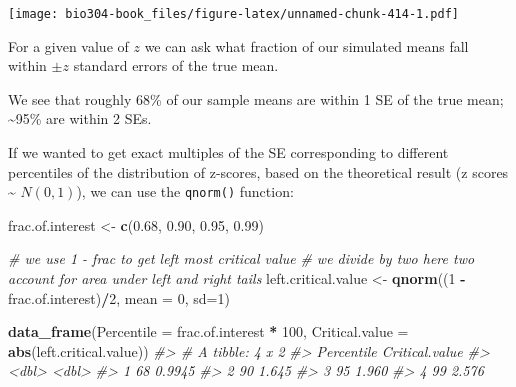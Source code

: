 \documentclass[]{book}
\newenvironment{Shaded}{\begin{snugshade}}{\end{snugshade}}
\newcommand{\CommentTok}[1]{\textcolor[rgb]{0.56,0.35,0.01}{\textit{#1}}}
\newcommand{\DataTypeTok}[1]{\textcolor[rgb]{0.13,0.29,0.53}{#1}}
\newcommand{\DecValTok}[1]{\textcolor[rgb]{0.00,0.00,0.81}{#1}}
\newcommand{\FloatTok}[1]{\textcolor[rgb]{0.00,0.00,0.81}{#1}}
\newcommand{\KeywordTok}[1]{\textcolor[rgb]{0.13,0.29,0.53}{\textbf{#1}}}
\newcommand{\NormalTok}[1]{#1}
\newcommand{\OperatorTok}[1]{\textcolor[rgb]{0.81,0.36,0.00}{\textbf{#1}}}
\newcommand{\StringTok}[1]{\textcolor[rgb]{0.31,0.60,0.02}{#1}}
\theoremstyle{definition}
\theoremstyle{definition}
\theoremstyle{definition}
\theoremstyle{remark}
\begin{document}
\texttt{[image: bio304-book\_files/figure-latex/unnamed-chunk-414-1.pdf]}

For a given value of \(z\) we can ask what fraction of our simulated
means fall within \(\pm z\) standard errors of the true mean.

\begin{Shaded}
\end{Shaded}

We see that roughly 68\% of our sample means are within 1 SE of the true
mean; \textasciitilde{}95\% are within 2 SEs.

If we wanted to get exact multiples of the SE corresponding to different
percentiles of the distribution of z-scores, based on the theoretical
result (z scores \textasciitilde{} \(N(0,1)\)), we can use the
\texttt{qnorm()} function:

\begin{Shaded}
\begin{Highlighting}[]
\NormalTok{frac.of.interest <-}\StringTok{ }\KeywordTok{c}\NormalTok{(}\FloatTok{0.68}\NormalTok{, }\FloatTok{0.90}\NormalTok{, }\FloatTok{0.95}\NormalTok{, }\FloatTok{0.99}\NormalTok{)}

\CommentTok{# we use 1 - frac to get left most critical value}
\CommentTok{# we divide by two here two account for area under left and right tails}
\NormalTok{left.critical.value <-}\StringTok{ }\KeywordTok{qnorm}\NormalTok{((}\DecValTok{1} \OperatorTok{-}\StringTok{ }\NormalTok{frac.of.interest)}\OperatorTok{/}\DecValTok{2}\NormalTok{, }\DataTypeTok{mean =} \DecValTok{0}\NormalTok{, }\DataTypeTok{sd=}\DecValTok{1}\NormalTok{) }

\KeywordTok{data_frame}\NormalTok{(}\DataTypeTok{Percentile =}\NormalTok{ frac.of.interest }\OperatorTok{*}\StringTok{ }\DecValTok{100}\NormalTok{,}
           \DataTypeTok{Critical.value =} \KeywordTok{abs}\NormalTok{(left.critical.value))}
\CommentTok{#> # A tibble: 4 x 2}
\CommentTok{#>   Percentile Critical.value}
\CommentTok{#>        <dbl>          <dbl>}
\CommentTok{#> 1         68         0.9945}
\CommentTok{#> 2         90         1.645 }
\CommentTok{#> 3         95         1.960 }
\CommentTok{#> 4         99         2.576}
\end{Highlighting}
\end{Shaded}
\end{document}
